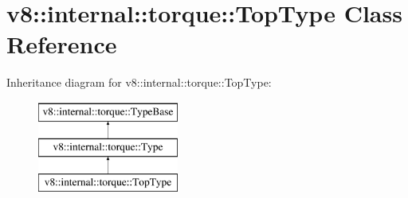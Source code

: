 \hypertarget{classv8_1_1internal_1_1torque_1_1TopType}{}\section{v8\+:\+:internal\+:\+:torque\+:\+:Top\+Type Class Reference}
\label{classv8_1_1internal_1_1torque_1_1TopType}
Inheritance diagram for v8\+:\+:internal\+:\+:torque\+:\+:Top\+Type\+:\begin{figure}[H]
\begin{center}
\leavevmode
\includegraphics[height=3.000000cm]{classv8_1_1internal_1_1torque_1_1TopType}
\end{center}
\end{figure}
